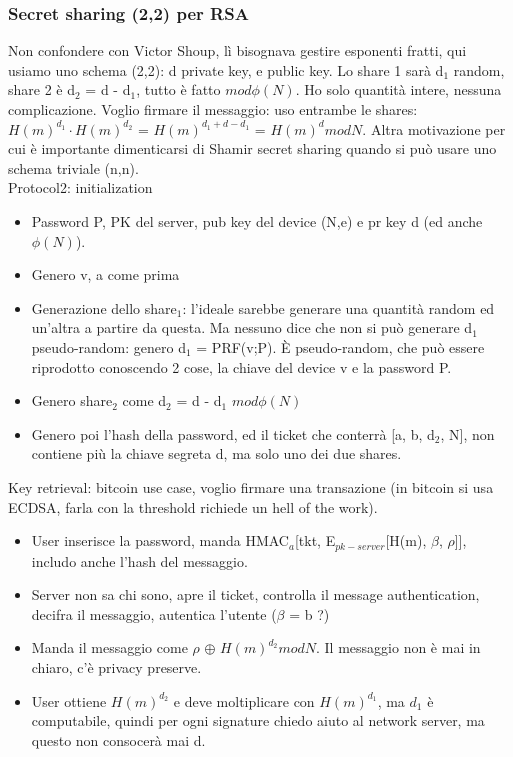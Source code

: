 \documentclass[16px]{article}
\begin{document}
\subsubsection{Secret sharing (2,2) per RSA}
Non confondere con Victor Shoup, lì bisognava gestire esponenti fratti, qui usiamo uno schema (2,2): d private key, e public key. Lo share 1 sarà d$_1$ random, share 2 è d$_2$ = d - d$_1$, tutto è fatto $mod\phi(N)$. Ho solo quantità intere, nessuna complicazione. Voglio firmare il messaggio: uso entrambe le shares: $H(m)^{d_1}\cdot H(m)^{d_2}$ = $H(m)^{d_1 + d - d_1}$ = $H(m)^d modN$. Altra motivazione per cui è importante dimenticarsi di Shamir secret sharing 	quando si può usare uno schema triviale (n,n).\\ Protocol2: initialization
\begin{itemize}
\item Password P, PK del server, pub key del device (N,e) e pr key d (ed anche $\phi(N)$).
\item Genero v, a come prima
\item Generazione dello share$_1$: l'ideale sarebbe generare una quantità random ed un'altra a partire da questa. Ma nessuno dice che non si può generare d$_1$ pseudo-random: genero d$_1$ = PRF(v;P). È pseudo-random, che può essere riprodotto conoscendo 2 cose, la chiave del device v e la password P.
\item Genero share$_2$ come d$_2$ = d - d$_1$ $mod\phi(N)$
\item Genero poi l'hash della password, ed il ticket che conterrà [a, b, d$_2$, N], non contiene più la chiave segreta d, ma solo uno dei due shares.
\end{itemize}
Key retrieval: bitcoin use case, voglio firmare una transazione (in bitcoin si usa ECDSA, farla con la threshold richiede un hell of the work).
\begin{itemize}
\item User inserisce la password, manda HMAC$_a$[tkt, E$_{pk-server}$[H(m), $\beta$, $\rho$]], includo anche l'hash del messaggio.
\item Server non sa chi sono, apre il ticket, controlla il message authentication, decifra il messaggio, autentica l'utente ($\beta$ = b ?)
\item Manda il messaggio come $\rho$ $\oplus$ $H(m)^{d_2} modN$. Il messaggio non è mai in chiaro, c'è privacy preserve.
\item User ottiene $H(m)^{d_2}$ e deve moltiplicare con $H(m)^{d_1}$, ma $d_1$ è computabile, quindi per ogni signature chiedo aiuto al network server, ma questo non consocerà mai d.
\end{itemize}
\end{document}
